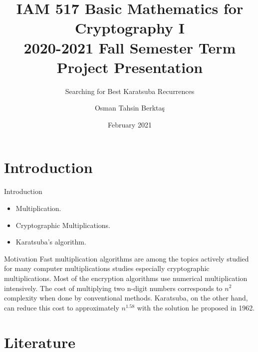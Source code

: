 \documentclass[12pt]{beamer}
\title{IAM 517
Basic Mathematics for Cryptography I\\
2020-2021 Fall Semester
Term Project Presentation
}
\subtitle{Searching for Best Karatsuba Recurrences}
\author{Osman Tahsin Berktaş}
\institute{}
\date{February 2021}
\begin{document}
\begin{frame}
  \titlepage
\end{frame}


\section{Introduction}

\begin{frame}{Introduction}

\begin{itemize}
  \item Multiplication.
  \item Cryptographic Multiplications.
  \item Karatsuba's algorithm.
\end{itemize}

\vskip 1cm

\begin{block}{Motivation}
Fast multiplication algorithms are among the topics actively studied for many computer multiplications studies especially cryptographic multiplications. Most of the encryption algorithms use numerical multiplication intensively. The cost of multiplying two n-digit numbers corresponds to $n^2$ complexity when done by conventional methods. Karatsuba, on the other hand, can reduce this cost to approximately $n^{1.58}$ with the solution he proposed in 1962.
\end{block}

\end{frame}




\section{Literature}
\end{document}
